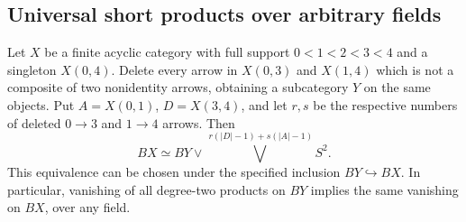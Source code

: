 \subsection{Universal short products over arbitrary fields}

\begin{lemma}
\label{A7:unused-long-wedges}
Let $X$ be a finite acyclic category with full support
$0<1<2<3<4$ and a singleton $X(0,4)$.
Delete every arrow in $X(0,3)$ and $X(1,4)$ which is not
a composite of two nonidentity arrows, obtaining a
subcategory $Y$ on the same objects. Put
$A=X(0,1)$, $D=X(3,4)$, and let $r,s$ be the respective
numbers of deleted $0\to3$ and $1\to4$ arrows. Then
\[
 BX\simeq BY\vee\bigvee^{\,r(|D|-1)+s(|A|-1)}S^2.
\]
This equivalence can be chosen under the specified
inclusion $BY\hookrightarrow BX$. In particular, vanishing
of all degree-two products on $BY$ implies the same
vanishing on $BX$, over any field.
\end{lemma}
